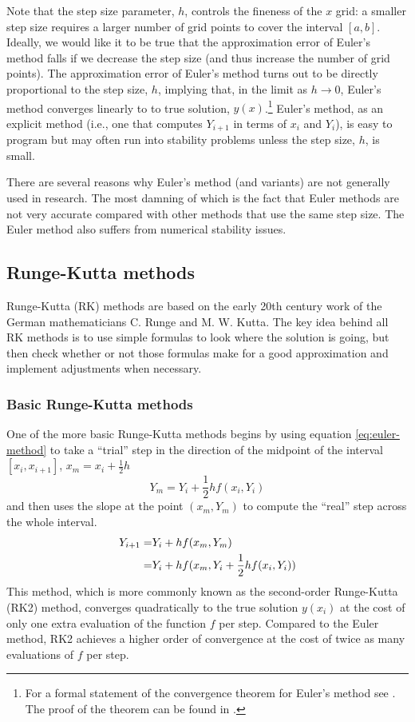 \documentclass[11pt]{article}
\begin{document}
Note that the step size parameter, $h$, controls the fineness of the $x$ grid: a smaller step size requires a larger number of grid points to cover the interval $[a,b]$. Ideally, we would like it to be true that the approximation error of Euler's method falls if we decrease the step size (and thus increase the number of grid points). The approximation error of Euler's method turns out to be directly proportional to the step size, $h$, implying that, in the limit as $h \rightarrow 0$, Euler's method converges linearly to to true solution, $y(x)$.\footnote{For a formal statement of the convergence theorem for Euler's method see \cite{judd1998numerical}. The proof of the theorem can be found in \cite{atkinson2008introduction}.} Euler's method, as an explicit method (i.e., one that computes $Y_{i+1}$ in terms of $x_i$ and $Y_i$), is easy to program but may often run into stability problems unless the step size, $h$, is small.

There are several reasons why Euler's method (and variants) are not generally used in research.  The most damning of which is the fact that Euler methods are not very accurate compared with other methods that use the same step size. The Euler method also suffers from numerical stability issues. 

\subsection{Runge-Kutta methods}
Runge-Kutta (RK) methods are based on the early 20th century work of the German mathematicians C. Runge and M. W. Kutta. The key idea behind all RK methods is to use simple formulas to look where the solution is going,  but then check whether or not those formulas make for a good approximation and implement adjustments when necessary.  

\subsubsection{Basic Runge-Kutta methods}
One of the more basic Runge-Kutta methods begins by using equation \ref{eq:euler-method} to take a ``trial'' step in the direction of the midpoint of the interval $[x_i, x_{i+1}]$, $x_m = x_i + \frac{1}{2}h$ 
\begin{equation}
	Y_m = Y_i + \frac{1}{2}hf(x_i, Y_i)
\end{equation}
and then uses the slope at the point $(x_m, Y_m)$ to compute the ``real'' step across the whole interval.
\begin{align}
	Y_{i+1} =& Y_i + hf(x_m, Y_m) \notag \\
	=& Y_i + hf(x_m, Y_i + \frac{1}{2}hf(x_i, Y_i))
\end{align}
This method, which is more commonly known as the second-order Runge-Kutta (RK2) method, converges quadratically to the true solution $y(x_i)$ at the cost of only one extra evaluation of the function $f$ per step.   Compared to the Euler method, RK2 achieves a higher order of convergence at the cost of twice as many evaluations of $f$ per step.
\end{document}
